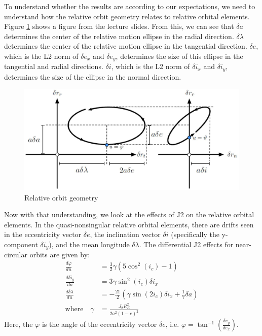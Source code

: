 To understand whether the results are according to our expectations, we need to understand how the relative orbit geometry relates to relative orbital elements. Figure \ref{fig:rel_geometry_summary} shows a figure from the lecture slides. From this, we can see that $\delta a$ determines the center of the relative motion ellipse in the radial direction. $\delta \lambda$ determines the center of the relative motion ellipse in the tangential direction. $\delta e$, which is the L2 norm of $\delta e_x$ and $\delta e_y$, determines the size of this ellipse in the tangential and radial directions. $\delta i$, which is the L2 norm of $\delta i_x$ and $\delta i_y$, determines the size of the ellipse in the normal direction. 

\begin{figure}[H]
    \centering
    \includegraphics[width=0.75\linewidth]{LaTeX/Figures/RelOrbitGeometry.jpg}
    \caption{Relative orbit geometry}
    \label{fig:rel_geometry_summary}
\end{figure}

Now with that understanding, we look at the effects of J2 on the relative orbital elements. In the quasi-nonsingular relative orbital elements, there are drifts seen in the eccentricity vector $\delta e$, the inclination vector $\delta i$ (specifically the y-component $\delta i_y$), and the mean longitude $\delta \lambda$. The differential J2 effects for near-circular orbits are given by:
\begin{align}
    \frac{d \varphi}{d u} &= \frac{3}{2} \gamma (5\cos^2(i_c) - 1) \\
    \frac{d \delta i_y}{d u} &= 3\gamma \sin^2(i_c) \delta i_x \label{eq:drift_in_rel_i} \\
    \frac{d \delta \lambda}{d u} &= -\frac{21}{2}\left(\gamma \sin(2i_c)\delta i_x 
+ \frac{1}{7} \delta a\right) \label{eq:drift_in_lambda_rel}\\
    \text{where} \quad \gamma  &= \frac{J_2 R_E^2}{2 a^2 (1 - e)^2}
\end{align}
Here, the $\varphi$ is the angle of the eccentricity vector $\delta e$, i.e. $\varphi = \tan^{-1}\left(\frac{\delta e_y}{\delta e_x}\right)$.

